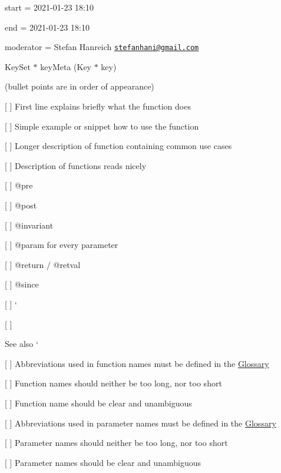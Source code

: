 
\begin{DoxyItemize}
\item start = 2021-\/01-\/23 18\+:10
\item end = 2021-\/01-\/23 18\+:10
\item moderator = Stefan Hanreich \href{mailto:stefanhani@gmail.com}{\tt stefanhani@gmail.\+com}
\end{DoxyItemize}

{\ttfamily Key\+Set $\ast$ key\+Meta (Key $\ast$ key)}

(bullet points are in order of appearance)


\begin{DoxyItemize}
\item \mbox{[} \mbox{]} First line explains briefly what the function does
\item \mbox{[} \mbox{]} Simple example or snippet how to use the function
\item \mbox{[} \mbox{]} Longer description of function containing common use cases
\item \mbox{[} \mbox{]} Description of functions reads nicely
\item \mbox{[} \mbox{]} {\ttfamily @pre}
\item \mbox{[} \mbox{]} {\ttfamily @post}
\item \mbox{[} \mbox{]} {\ttfamily @invariant}
\item \mbox{[} \mbox{]} {\ttfamily @param} for every parameter
\item \mbox{[} \mbox{]} {\ttfamily @return} / {\ttfamily @retval}
\item \mbox{[} \mbox{]} {\ttfamily @since}
\item \mbox{[} \mbox{]} `{\ttfamily }
\item {\ttfamily \mbox{[} \mbox{]}}\begin{DoxySeeAlso}{See also}
`
\end{DoxySeeAlso}

\end{DoxyItemize}


\begin{DoxyItemize}
\item \mbox{[} \mbox{]} Abbreviations used in function names must be defined in the \hyperlink{doc_help_elektra-glossary_md}{Glossary}
\item \mbox{[} \mbox{]} Function names should neither be too long, nor too short
\item \mbox{[} \mbox{]} Function name should be clear and unambiguous
\item \mbox{[} \mbox{]} Abbreviations used in parameter names must be defined in the \hyperlink{doc_help_elektra-glossary_md}{Glossary}
\item \mbox{[} \mbox{]} Parameter names should neither be too long, nor too short
\item \mbox{[} \mbox{]} Parameter names should be clear and unambiguous
\end{DoxyItemize}

